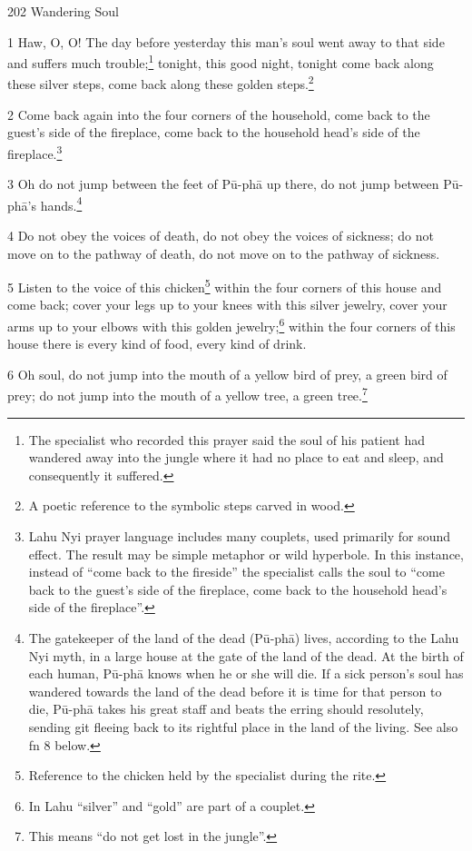 
202 Wandering Soul

1 Haw, O, O! The day before yesterday this man's soul went away to that side and
suffers much trouble;\footnote{The specialist who recorded this prayer said the soul of his patient had wandered away into the jungle where it had no place to eat and sleep, and consequently it suffered.} tonight, this good night, tonight come back along these
silver steps, come back along these golden steps.\footnote{A poetic reference to the symbolic steps carved in wood.}

2 Come back again into the four corners of the household, come back to the guest's
side of the fireplace, come back to the household head's side of the fireplace.\footnote{Lahu Nyi prayer language includes many couplets, used primarily for sound effect. The result may be simple metaphor or wild hyperbole. In this instance, instead of ``come back to the fireside'' the specialist calls the soul to ``come back to the guest's side of the fireplace, come back to the household head's side of the fireplace''.}

3 Oh do not jump between the feet of Pū-phā up there, do not jump between Pū-phā's
hands.\footnote{The gatekeeper of the land of the dead (Pū-phā) lives, according to the Lahu Nyi myth, in a large house at the gate of the land of the dead. At the birth of each human, Pū-phā knows when he or she will die. If a sick person's soul has wandered towards the land of the dead before it is time for that person to die, Pū-phā takes his great staff and beats the erring should resolutely, sending git fleeing back to its rightful place in the land of the living. See also fn 8 below.}

4 Do not obey the voices of death, do not obey the voices of sickness; do not move
on to the pathway of death, do not move on to the pathway of sickness.

5 Listen to the voice of this chicken\footnote{Reference to the chicken held by the specialist during the rite.} within the four corners of this house
and come back; cover your legs up to your knees with this silver jewelry, cover
your arms up to your elbows with this golden jewelry;\footnote{In Lahu ``silver'' and ``gold'' are part of a couplet.} within the four corners
of this house there is every kind of food, every kind of drink.

6 Oh soul, do not jump into the mouth of a yellow bird of prey, a green bird of
prey; do not jump into the mouth of a yellow tree, a green tree.\footnote{This means ``do not get lost in the jungle''.}


